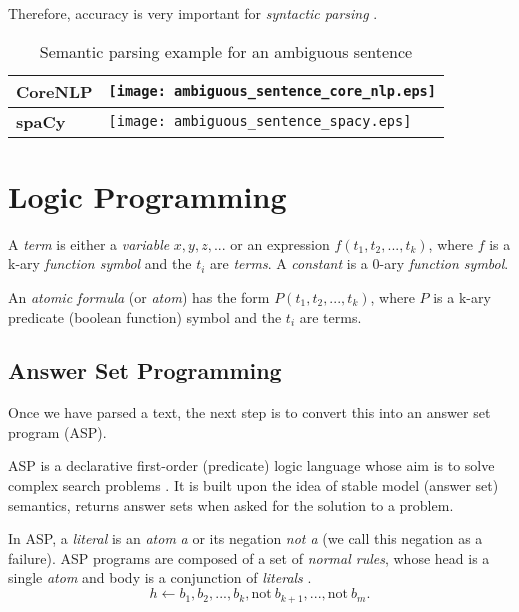 Therefore, accuracy is very important for \textit{syntactic parsing} \cite{gomez-rodriguez_how_2019}.

\begin{table}[H]
\centering
\begin{tabular}{@{}ll@{}}
\toprule
\textbf{CoreNLP} & \texttt{[image: ambiguous\_sentence\_core\_nlp.eps]} \\ \midrule
\textbf{spaCy} & \texttt{[image: ambiguous\_sentence\_spacy.eps]}  \\ \bottomrule
\end{tabular}
\caption{Semantic parsing example for an ambiguous sentence}
\label{table:ambiguous_sentence}
\end{table}

\section{Logic Programming}

\begin{definition}
A \textit{term} is either a \textit{variable} $x,y,z,...$ or an expression $f(t_1,t_2,...,t_k)$, where $f$ is a k-ary \textit{function symbol} and the $t_i$ are \textit{terms}. A \textit{constant} is a 0-ary \textit{function symbol}.
\end{definition}

\begin{definition}
An \textit{atomic formula} (or \textit{atom}) has the form $P(t_1,t_2,...,t_k)$, where $P$ is a k-ary predicate (boolean function) symbol and the $t_i$ are terms.
\end{definition}

\subsection{Answer Set Programming}

Once we have parsed a text, the next step is to convert this into an answer set program (ASP).

ASP is a declarative first-order (predicate) logic language whose aim is to solve complex search problems \cite{lifschitz_what_nodate}. It is built upon the idea of stable model (answer set) semantics, returns answer sets when asked for the solution to a problem.

In ASP, a \textit{literal} is an \textit{atom} \textit{a} or its negation \textit{not a} (we call this negation as a failure). ASP programs are composed of a set of \textit{normal rules}, whose head is a single \textit{atom} and body is a conjunction of \textit{literals} \cite{law_representing_2019}.
\begin{equation}
h \leftarrow b_1, b_2, ..., b_k, \text{not}\ b_{k+1}, ..., \text{not}\ b_m.
\end{equation}

